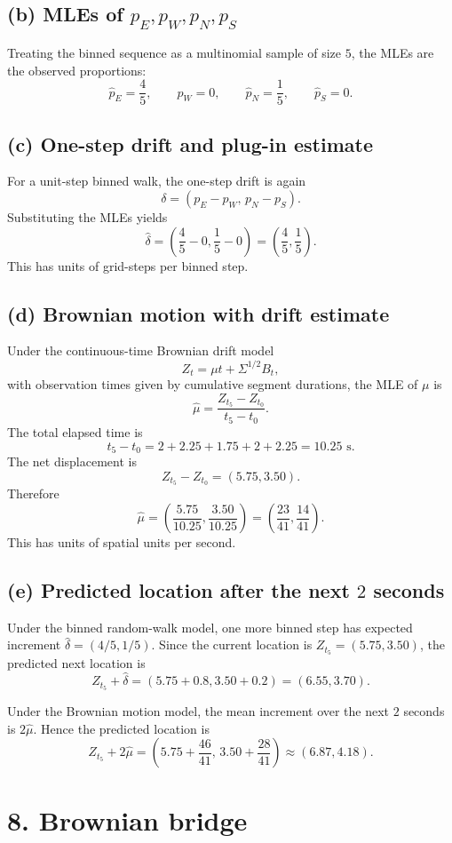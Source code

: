 \documentclass[11pt]{article}
\begin{document}
\subsection*{(b) MLEs of $p_E,p_W,p_N,p_S$}
Treating the binned sequence as a multinomial sample of size $5$, the MLEs are the observed proportions:
\[
\hat p_E=\frac45,
\qquad
\hat p_W=0,
\qquad
\hat p_N=\frac15,
\qquad
\hat p_S=0.
\]

\subsection*{(c) One-step drift and plug-in estimate}
For a unit-step binned walk, the one-step drift is again
\[
\delta=(p_E-p_W,\,p_N-p_S).
\]
Substituting the MLEs yields
\[
\hat\delta=\left(\frac45-0,\frac15-0\right)=\left(\frac45,\frac15\right).
\]
This has units of grid-steps per binned step.

\subsection*{(d) Brownian motion with drift estimate}
Under the continuous-time Brownian drift model
\[
Z_t=\mu t+\Sigma^{1/2}B_t,
\]
with observation times given by cumulative segment durations, the MLE of $\mu$ is
\[
\hat\mu=\frac{Z_{t_5}-Z_{t_0}}{t_5-t_0}.
\]
The total elapsed time is
\[
t_5-t_0=2+2.25+1.75+2+2.25=10.25\text{ s}.
\]
The net displacement is
\[
Z_{t_5}-Z_{t_0}=(5.75,3.50).
\]
Therefore
\[
\hat\mu=\left(\frac{5.75}{10.25},\frac{3.50}{10.25}\right)=\left(\frac{23}{41},\frac{14}{41}\right).
\]
This has units of spatial units per second.

\subsection*{(e) Predicted location after the next $2$ seconds}
Under the binned random-walk model, one more binned step has expected increment $\hat\delta=(4/5,1/5)$. Since the current location is $Z_{t_5}=(5.75,3.50)$, the predicted next location is
\[
Z_{t_5}+\hat\delta=(5.75+0.8,3.50+0.2)=(6.55,3.70).
\]

Under the Brownian motion model, the mean increment over the next $2$ seconds is $2\hat\mu$. Hence the predicted location is
\[
Z_{t_5}+2\hat\mu
=
\left(5.75+\frac{46}{41},\,3.50+\frac{28}{41}\right)
\approx (6.87,4.18).
\]

\newpage
\section*{8. Brownian bridge}
\end{document}
